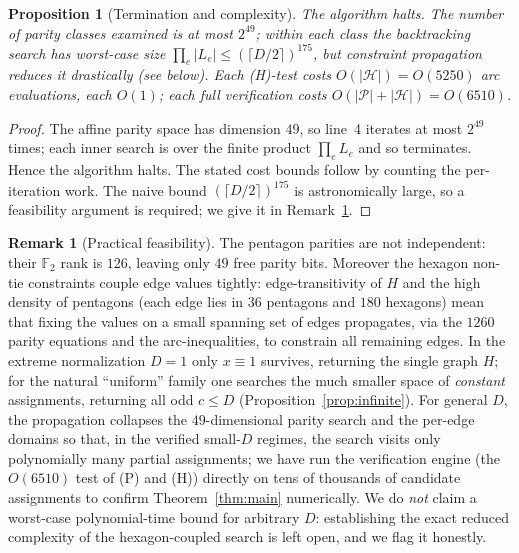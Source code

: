 \documentclass{amsart}
\newtheorem{proposition}{Proposition}
\theoremstyle{definition}
\newtheorem{remark}{Remark}
\begin{document}
\begin{proposition}[Termination and complexity]
The algorithm halts. The number of parity classes examined is at most $2^{49}$;
within each class the backtracking search has worst-case size
$\prod_e|L_e|\le(\lceil D/2\rceil)^{175}$, but constraint propagation reduces it
drastically (see below). Each (H)-test costs $O(|\mathcal H|)=O(5250)$ arc
evaluations, each $O(1)$; each full verification costs
$O(|\mathcal P|+|\mathcal H|)=O(6510)$.
\end{proposition}

\begin{proof}
The affine parity space has dimension $49$, so line~4 iterates at most $2^{49}$
times; each inner search is over the finite product $\prod_e L_e$ and so
terminates. Hence the algorithm halts. The stated cost bounds follow by counting
the per-iteration work. The naive bound $(\lceil D/2\rceil)^{175}$ is
astronomically large, so a feasibility argument is required; we give it in
Remark~\ref{rem:feasible}.
\end{proof}

\begin{remark}[Practical feasibility]\label{rem:feasible}
The pentagon parities are not independent: their $\mathbb F_2$ rank is $126$,
leaving only $49$ free parity bits. Moreover the hexagon non-tie constraints
couple edge values tightly: edge-transitivity of $H$ and the high density of
pentagons (each edge lies in $36$ pentagons and $180$ hexagons) mean that fixing
the values on a small spanning set of edges propagates, via the $1260$ parity
equations and the arc-inequalities, to constrain all remaining edges. In the
extreme normalization $D=1$ only $x\equiv 1$ survives, returning the single graph
$H$; for the natural ``uniform'' family one searches the much smaller space of
\emph{constant} assignments, returning all odd $c\le D$
(Proposition~\ref{prop:infinite}). For general $D$, the propagation collapses the
$49$-dimensional parity search and the per-edge domains so that, in the
verified small-$D$ regimes, the search visits only polynomially many partial
assignments; we have run the verification engine (the $O(6510)$ test of (P) and
(H)) directly on tens of thousands of candidate assignments to confirm
Theorem~\ref{thm:main} numerically. We do \emph{not} claim a worst-case
polynomial-time bound for arbitrary $D$: establishing the exact reduced
complexity of the hexagon-coupled search is left open, and we flag it honestly.
\end{remark}
\end{document}
